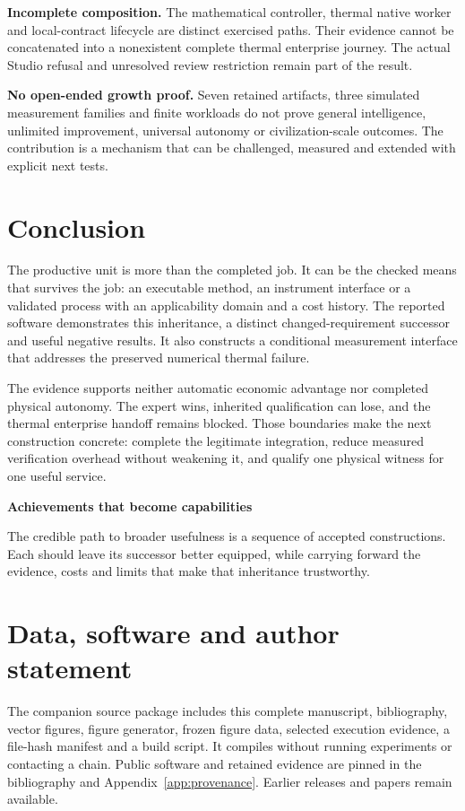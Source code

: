 \documentclass[11pt,a4paper]{article}
\newcommand{\claim}[2]{\begin{tcolorbox}[enhanced,colback=wash,colframe=purple,boxrule=0pt,borderline west={2pt}{0pt}{purple},arc=0pt,left=9pt,right=9pt,top=7pt,bottom=7pt]\sffamily\textbf{#1}\par\smallskip\normalfont #2\end{tcolorbox}}
\begin{document}
\textbf{Incomplete composition.} The mathematical controller, thermal native worker and local-contract lifecycle are distinct exercised paths. Their evidence cannot be concatenated into a nonexistent complete thermal enterprise journey. The actual Studio refusal and unresolved review restriction remain part of the result.

\textbf{No open-ended growth proof.} Seven retained artifacts, three simulated measurement families and finite workloads do not prove general intelligence, unlimited improvement, universal autonomy or civilization-scale outcomes. The contribution is a mechanism that can be challenged, measured and extended with explicit next tests.

\section{Conclusion}
The productive unit is more than the completed job. It can be the checked means that survives the job: an executable method, an instrument interface or a validated process with an applicability domain and a cost history. The reported software demonstrates this inheritance, a distinct changed-requirement successor and useful negative results. It also constructs a conditional measurement interface that addresses the preserved numerical thermal failure.

The evidence supports neither automatic economic advantage nor completed physical autonomy. The expert wins, inherited qualification can lose, and the thermal enterprise handoff remains blocked. Those boundaries make the next construction concrete: complete the legitimate integration, reduce measured verification overhead without weakening it, and qualify one physical witness for one useful service.

\claim{Achievements that become capabilities}{The credible path to broader usefulness is a sequence of accepted constructions. Each should leave its successor better equipped, while carrying forward the evidence, costs and limits that make that inheritance trustworthy.}

\section*{Data, software and author statement}
The companion source package includes this complete manuscript, bibliography, vector figures, figure generator, frozen figure data, selected execution evidence, a file-hash manifest and a build script. It compiles without running experiments or contacting a chain. Public software and retained evidence are pinned in the bibliography and Appendix~\ref{app:provenance}. Earlier releases and papers remain available.
\end{document}
